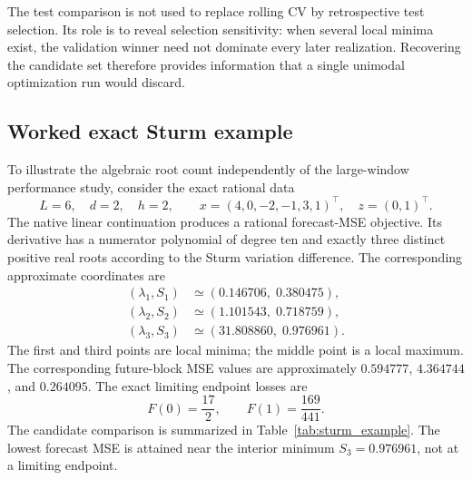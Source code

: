 \documentclass[english]{smcca}
\begin{document}
The test comparison is not used to replace rolling CV by retrospective test
selection. Its role is to reveal selection sensitivity: when several local
minima exist, the validation winner need not dominate every later realization.
Recovering the candidate set therefore provides information that a single
unimodal optimization run would discard.



\subsection{Worked exact Sturm example}
\label{sec:sturm_example}

To illustrate the algebraic root count independently of the
large-window performance study, consider the exact rational
data
\begin{equation}
\label{eq:sturm_example_data}
L=6,\quad d=2,\quad h=2,\qquad
x=(4,0,-2,-1,3,1)^\top,\quad z=(0,1)^\top.
\end{equation}
The native linear continuation produces a rational forecast-MSE
objective. Its derivative has a numerator polynomial of degree
ten and exactly three distinct positive real roots according
to the Sturm variation difference. The corresponding
approximate coordinates are
\begin{equation}
\label{eq:sturm_example_roots}
\begin{aligned}
(\lambda_1,S_1)&\simeq(0.146706,\;0.380475),\\
(\lambda_2,S_2)&\simeq(1.101543,\;0.718759),\\
(\lambda_3,S_3)&\simeq(31.808860,\;0.976961).
\end{aligned}
\end{equation}
The first and third points are local minima; the middle
point is a local maximum. The corresponding future-block
MSE values are approximately $0.594777$, $4.364744$,
and $0.264095$. The exact limiting endpoint losses are
\begin{equation}
\label{eq:sturm_example_endpoints}
F(0)=\frac{17}{2},\qquad
F(1)=\frac{169}{441}.
\end{equation}
The candidate comparison is summarized in
Table~\ref{tab:sturm_example}. The lowest forecast MSE is
attained near the interior minimum $S_3=0.976961$,
not at a limiting endpoint.
\end{document}
